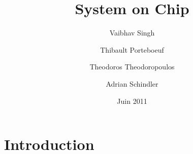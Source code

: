 \documentclass[a4paper,10pt]{article}
\begin{document}
\title{System on Chip}

\author{Vaibhav Singh \and Thibault Porteboeuf \and Theodoros
Theodoropoulos \and Adrian Schindler}

\date{Juin 2011}
\maketitle

\tableofcontents

\section{Introduction} 
\end{document}
